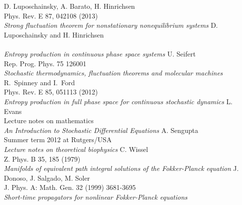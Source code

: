 \begin{thebibliography}{99}
	 {
		D. Luposchainsky, A. Barato, H. Hinrichsen \\
		Phys. Rev. E 87, 042108 (2013) \\
		\emph{Strong fluctuation theorem for nonstationary nonequilibrium systems}
		}
	 {
		D. Luposchainsky and H. Hinrichsen \\
		 \\
		\emph{Entropy production in continuous phase space systems}
		}
	 {
		U. Seifert \\
		Rep. Prog. Phys. 75 126001 \\
		\emph{Stochastic thermodynamics, fluctuation theorems and molecular machines}
		}
	 {
		R.~Spinney and I.~Ford \\
		Phys. Rev. E 85, 051113 (2012) \\
		\emph{Entropy production in full phase space for continuous stochastic dynamics}
		}
	 {
		L. Evans \\
		Lecture notes on mathematics \\
		\emph{An Introduction to Stochastic Differential Equations}
		}
	 {
		A. Sengupta \\
		Summer term 2012 at Rutgers/USA \\
		\emph{Lecture notes on theoretical biophysics}
		}
	 {
		C. Wissel \\
		Z. Phys. B 35, 185 (1979) \\
		\emph{Manifolds of equivalent path integral solutions of the Fokker-Planck equation}
		}
	 {
		J. Donoso, J. Salgado, M. Soler \\
		J. Phys. A: Math. Gen. 32 (1999) 3681-3695 \\
		\emph{Short-time propagators for nonlinear Fokker-Planck equations}
		}

		
\end{thebibliography}
